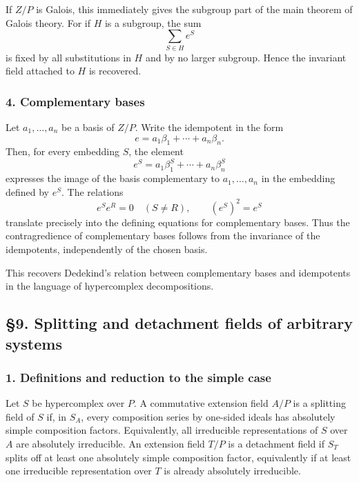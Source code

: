 \documentclass[11pt]{article}
\begin{document}
If \(Z/P\) is Galois, this immediately gives the subgroup part of the
main theorem of Galois theory. For if \(H\) is a subgroup, the sum \[
  \sum_{S\in H} e^S
\] is fixed by all substitutions in \(H\) and by no larger subgroup.
Hence the invariant field attached to \(H\) is recovered.

\subsubsection{4. Complementary bases}\label{complementary-bases}

Let \(a_1,
\ldots,a_n\) be a basis of \(Z/P\). Write the idempotent in the form \[
  e=a_1\beta_1+
\cdots+a_n\beta_n.
\] Then, for every embedding \(S\), the element \[
  e^S=a_1\beta_1^S+
\cdots+a_n\beta_n^S
\] expresses the image of the basis complementary to \(a_1,
\ldots,a_n\) in the embedding defined by \(e^S\). The relations \[
  e^Se^R=0\quad(S\ne R),
  \qquad (e^S)^2=e^S
\] translate precisely into the defining equations for complementary
bases. Thus the contragredience of complementary bases follows from the
invariance of the idempotents, independently of the chosen basis.

This recovers Dedekind's relation between complementary bases and
idempotents in the language of hypercomplex decompositions.

\subsection{§9. Splitting and detachment fields of arbitrary
systems}\label{splitting-and-detachment-fields-of-arbitrary-systems}

\subsubsection{1. Definitions and reduction to the simple
case}\label{definitions-and-reduction-to-the-simple-case}

Let \(S\) be hypercomplex over \(P\). A commutative extension field
\(A/P\) is a splitting field of \(S\) if, in \(S_A\), every composition
series by one-sided ideals has absolutely simple composition factors.
Equivalently, all irreducible representations of \(S\) over \(A\) are
absolutely irreducible. An extension field \(T/P\) is a detachment field
if \(S_T\) splits off at least one absolutely simple composition factor,
equivalently if at least one irreducible representation over \(T\) is
already absolutely irreducible.
\end{document}
